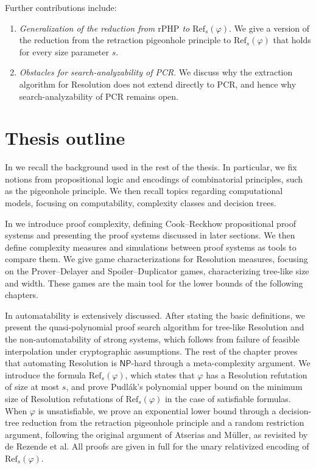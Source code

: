 Further contributions include:
\begin{enumerate}
    \item \textit{Generalization of the reduction from $\mathrm{rPHP}$ to $\mathrm{Ref}_s(\varphi)$}. We give a version of the reduction from the retraction pigeonhole principle to $\mathrm{Ref}_s(\varphi)$ that holds for every size parameter $s$.
    \item \textit{Obstacles for search-analyzability of PCR}. We discuss why the extraction algorithm for Resolution does not extend directly to PCR, and hence why search-analyzability of PCR remains open.
\end{enumerate}

\section*{Thesis outline}

In  we recall the background used in the rest of the thesis. In particular, we fix notions from propositional logic and encodings of combinatorial principles, such as the pigeonhole principle. We then recall topics regarding computational models, focusing on computability, complexity classes and decision trees.

In  we introduce proof complexity, defining Cook--Reckhow propositional proof systems and presenting the proof systems discussed in later sections. We then define complexity measures and simulations between proof systems as tools to compare them. We give game characterizations for Resolution measures, focusing on the Prover--Delayer and Spoiler--Duplicator games, characterizing tree-like size and width. These games are the main tool for the lower bounds of the following chapters.

In  automatability is extensively discussed. After stating the basic definitions, we present the quasi-polynomial proof search algorithm for tree-like Resolution and the non-automatability of strong systems, which follows from failure of feasible interpolation under cryptographic assumptions. The rest of the chapter proves that automating Resolution is $\mathsf{NP}$-hard through a meta-complexity argument. We introduce the formula $\mathrm{Ref}_s(\varphi)$, which states that $\varphi$ has a Resolution refutation of size at most $s$, and prove Pudlák's polynomial upper bound on the minimum size of Resolution refutations of $\mathrm{Ref}_s(\varphi)$ in the case of satisfiable formulas. When $\varphi$ is unsatisfiable, we prove an exponential lower bound through a decision-tree reduction from the retraction pigeonhole principle and a random restriction argument, following the original argument of Atserias and Müller, as revisited by de Rezende et al. All proofs are given in full for the unary relativized encoding of $\mathrm{Ref}_s(\varphi)$.

